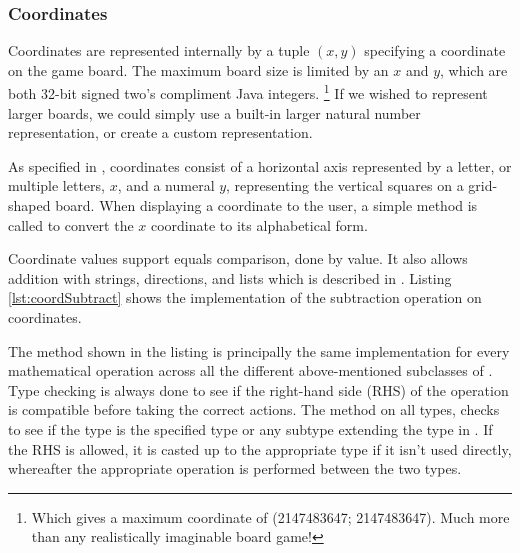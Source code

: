 \subsubsection{Coordinates}
Coordinates are represented internally by a tuple $(x, y)$ specifying a
coordinate on the game board. The maximum board size is limited by an $x$ and
$y$, which are both 32-bit signed two's compliment Java integers.
\footnote{ Which gives a maximum coordinate of (\num{2147483647}; \num{2147483647}).
Much more than any realistically imaginable board game!}
If we wished to represent larger boards, we could simply use a built-in larger
natural number representation, or create a custom representation.

As specified in , coordinates consist of
a horizontal axis represented by a letter, or multiple letters, $x$, and a
numeral $y$, representing the vertical squares on a grid-shaped board.
When displaying a coordinate to the user, a simple method is called to
convert the $x$ coordinate to its alphabetical form.

Coordinate values support equals comparison, done by value. It also allows
addition with strings, directions, and lists which is described in
. Listing \ref{lst:coordSubtract} shows the
implementation of the subtraction operation on coordinates.



The method shown in the listing is principally the same implementation for every
mathematical operation across all the different above-mentioned subclasses of
. Type checking is always done to see if the right-hand side
(RHS) of
the operation is compatible before taking the correct actions. The method
 on all  types, checks to see if the type is the
specified type or any subtype extending the type in \productname{}. If the RHS
is allowed, it is casted up to the appropriate type if it isn't used directly,
whereafter the appropriate operation is performed between the two types.

%


